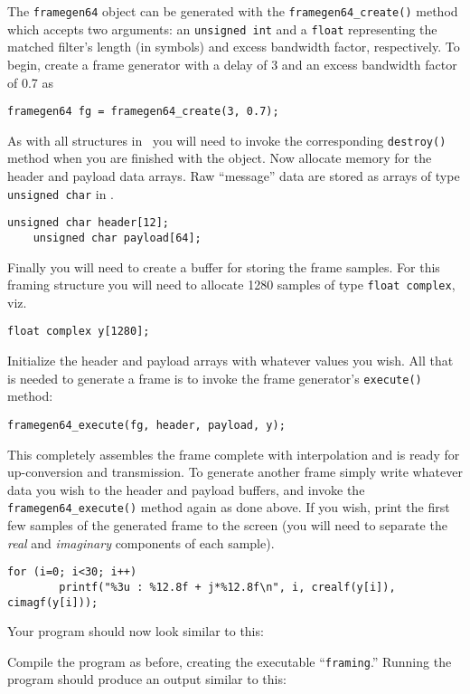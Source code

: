 The {\tt framegen64} object can be generated with the
{\tt framegen64\_create()} method which accepts two arguments:
an {\tt unsigned int} and a {\tt float}
representing the matched filter's length (in symbols) and
excess bandwidth factor, respectively.
To begin, create a frame generator with a delay of 3 and an excess
bandwidth factor of 0.7 as
%
\begin{Verbatim}[fontsize=\small]
    framegen64 fg = framegen64_create(3, 0.7);
\end{Verbatim}
%
As with all structures in \liquid\ you will need to invoke the
corresponding {\tt destroy()} method when you are finished with the
object.
Now allocate memory for the header and payload data arrays.
Raw ``message'' data are stored as arrays of type {\tt unsigned char} in
\liquid.
%
\begin{Verbatim}[fontsize=\small]
    unsigned char header[12];
    unsigned char payload[64];
\end{Verbatim}
%
Finally you will need to create a buffer for storing the frame samples.
For this framing structure you will need to allocate 1280 samples of
type {\tt float complex}, viz.
%
\begin{Verbatim}[fontsize=\small]
    float complex y[1280];
\end{Verbatim}
%
Initialize the header and payload arrays with whatever values you wish.
All that is needed to generate a frame is to invoke the frame
generator's {\tt execute()} method:
%
\begin{Verbatim}[fontsize=\small]
    framegen64_execute(fg, header, payload, y);
\end{Verbatim}
%
This completely assembles the frame complete with interpolation and is
ready for up-conversion and transmission.
To generate another frame simply write whatever data you wish to the
header and payload buffers, and invoke the {\tt framegen64\_execute()}
method again as done above.
If you wish, print the first few samples of the generated frame to the
screen (you will need to separate the {\em real} and {\em imaginary}
components of each sample).
%
\begin{Verbatim}[fontsize=\small]
    for (i=0; i<30; i++)
        printf("%3u : %12.8f + j*%12.8f\n", i, crealf(y[i]), cimagf(y[i]));
\end{Verbatim}
%
Your program should now look similar to this:
%

%
Compile the program as before, creating the executable
``{\tt framing}.''
Running the program should produce an output similar to this:
